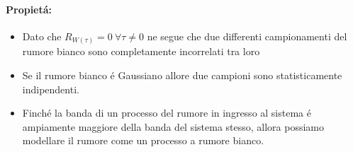             \paragraph{Propietá:}
            \begin{itemize}
                \item {Dato che $R_{W(\tau)}=0\ \forall \tau\neq 0$ ne segue che due differenti campionamenti del rumore bianco sono completamente
                incorrelati tra loro}
                \item {
                    Se il rumore bianco é Gaussiano allore due campioni sono statisticamente indipendenti.
                }
                \item {
                    Finché la banda di un processo del rumore in ingresso al sistema é ampiamente maggiore della banda del sistema stesso, allora possiamo modellare
                    il rumore come un processo a rumore bianco.
                }
            \end{itemize}
